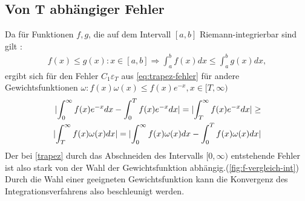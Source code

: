 \documentclass[12pt,a4paper]{scrartcl}
\numberwithin{equation}{section}
\numberwithin{myalgctr}{section}
\numberwithin{mytheoremctr}{subsection}
\numberwithin{mykorollarctr}{subsection}
\numberwithin{mylemmactr}{subsection}
\numberwithin{mybeispielctr}{subsection}
\DeclarePairedDelimiter{\abs}{\lvert}{\rvert}
\begin{document}
	
		
		 
		\subsection{Von T abh\"angiger Fehler}
	Da f\"ur Funktionen $f,g$, die auf dem Intervall $[a,b]$ Riemann-integrierbar sind gilt \autocite[vgl.][271]{ana2}: 
	\begin{align*}
		f(x)\leq g(x): x \in [a,b]\Rightarrow \int_{a}^{b}f(x)dx \leq \int_{a}^{b}g(x)dx,
	\end{align*}
	ergibt sich f\"ur den Fehler $C_1\varepsilon_T$ aus \cref{eq:trapez-fehler} f\"ur andere Gewichtsfunktionen $\omega : f(x)\omega(x) \leq f(x)e^{-x}, x \in [T,\infty)$
	\begin{align*}
		\abs{\int_{0}^{\infty}f(x)e^{-x}dx-\int_{0}^{T}f(x)e^{-x}dx} = \abs{\int_{T}^{\infty}f(x)e^{-x}dx} \geq \\
		\abs{\int_{T}^{\infty}f(x)\omega(x)dx} =  \abs{\int_{0}^{\infty}f(x)\omega(x)dx-\int_{0}^{T}f(x)\omega(x)dx}
	\end{align*}	
	Der bei \cref{trapez} durch das Abschneiden des Intervalls $[0,\infty)$ entstehende Fehler ist also stark von der Wahl der Gewichtsfunktion abh\"angig.(\cref{fig:f-vergleich-int}) 
	Durch die Wahl einer geeigneten Gewichtsfunktion kann die Konvergenz des Integrationsverfahrens also beschleunigt werden.
	
\end{document}
